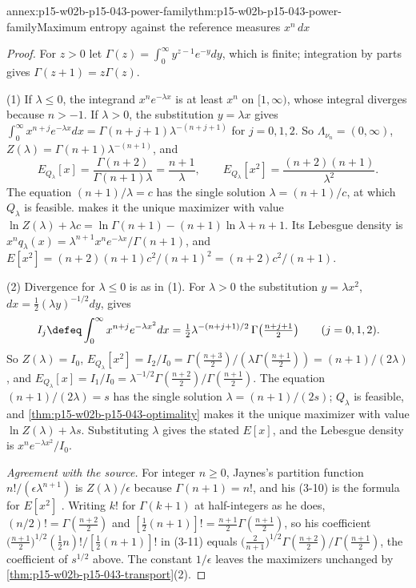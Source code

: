 \begin{annexitem}{annex:p15-w02b-p15-043-power-family}{thm:p15-w02b-p15-043-power-family}{Maximum entropy against the reference measures \(x^n\,dx\)}
\begin{proof}
For \(z>0\) let \(\Gamma(z)=\int_0^\infty y^{z-1}e^{-y}dy\), which is finite;
integration by parts gives \(\Gamma(z+1)=z\Gamma(z)\).

(1) If \(\lambda\leq0\), the integrand \(x^ne^{-\lambda x}\) is at least \(x^n\)
on \([1,\infty)\), whose integral diverges because \(n>-1\). If \(\lambda>0\),
the substitution \(y=\lambda x\) gives
\(\int_0^\infty x^{n+j}e^{-\lambda x}dx=\Gamma(n+j+1)\lambda^{-(n+j+1)}\) for
\(j=0,1,2\). So \(\Lambda_{\nu_n}=(0,\infty)\),
\(Z(\lambda)=\Gamma(n+1)\lambda^{-(n+1)}\), and
\[
 E_{Q_\lambda}[x]=\frac{\Gamma(n+2)}{\Gamma(n+1)\lambda}=\frac{n+1}\lambda,
 \qquad
 E_{Q_\lambda}[x^2]=\frac{(n+2)(n+1)}{\lambda^2}.
\]
The equation \((n+1)/\lambda=c\) has the single solution \(\lambda=(n+1)/c\),
at which \(Q_\lambda\) is feasible.  makes
it the unique maximizer with value
\(\ln Z(\lambda)+\lambda c=\ln\Gamma(n+1)-(n+1)\ln\lambda+n+1\). Its Lebesgue
density is \(x^nq_\lambda(x)=\lambda^{n+1}x^ne^{-\lambda x}/\Gamma(n+1)\), and
\(E[x^2]=(n+2)(n+1)c^2/(n+1)^2=(n+2)c^2/(n+1)\).

(2) Divergence for \(\lambda\leq0\) is as in (1). For \(\lambda>0\) the
substitution \(y=\lambda x^2\), \(dx=\tfrac12(\lambda y)^{-1/2}dy\), gives
\[
 I_j\defeq\int_0^\infty x^{n+j}e^{-\lambda x^2}dx
 =\tfrac12\lambda^{-(n+j+1)/2}\,\Gamma\bigl(\tfrac{n+j+1}2\bigr)
 \qquad(j=0,1,2).
\]
So \(Z(\lambda)=I_0\), \(E_{Q_\lambda}[x^2]=I_2/I_0=\Gamma(\tfrac{n+3}2)/
(\lambda\Gamma(\tfrac{n+1}2))=(n+1)/(2\lambda)\), and
\(E_{Q_\lambda}[x]=I_1/I_0=\lambda^{-1/2}\Gamma(\tfrac{n+2}2)/\Gamma(\tfrac{n+1}2)\).
The equation \((n+1)/(2\lambda)=s\) has the single solution
\(\lambda=(n+1)/(2s)\); \(Q_\lambda\) is feasible, and
\cref{thm:p15-w02b-p15-043-optimality} makes it the unique maximizer with value
\(\ln Z(\lambda)+\lambda s\). Substituting \(\lambda\) gives the stated
\(E[x]\), and the Lebesgue density is \(x^n e^{-\lambda x^2}/I_0\).

\emph{Agreement with the source.} For integer \(n\geq0\), Jaynes's partition
function \(n!/(\epsilon\lambda^{n+1})\) is \(Z(\lambda)/\epsilon\) because
\(\Gamma(n+1)=n!\), and his (3-10) is the formula for \(E[x^2]\)
\cite[p.~625]{Jaynes1957InformationTheory}. Writing \(k!\) for \(\Gamma(k+1)\) at
half-integers as he does, \((n/2)!=\Gamma(\tfrac{n+2}2)\) and
\([\tfrac12(n+1)]!=\tfrac{n+1}2\Gamma(\tfrac{n+1}2)\), so his coefficient
\(\bigl(\tfrac{n+1}2\bigr)^{1/2}(\tfrac12n)!/[\tfrac12(n+1)]!\) in (3-11) equals
\(\bigl(\tfrac2{n+1}\bigr)^{1/2}\Gamma(\tfrac{n+2}2)/\Gamma(\tfrac{n+1}2)\), the
coefficient of \(s^{1/2}\) above. The constant \(1/\epsilon\) leaves the
maximizers unchanged by \cref{thm:p15-w02b-p15-043-transport}(2).
\end{proof}
\end{annexitem}
